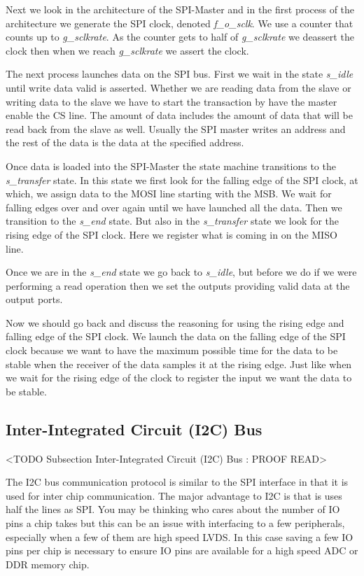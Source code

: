Next we look in the architecture of the \ac{SPI}-Master and in the first process of the architecture we generate the \ac{SPI} clock, denoted \emph{f\_o\_sclk}. We use a counter that counts up to \emph{g\_sclkrate}. As the counter gets to half of \emph{g\_sclkrate} we deassert the clock then when we reach \emph{g\_sclkrate} we assert the clock. 

The next process launches data on the \ac{SPI} bus. First we wait in the state \emph{s\_idle} until write data valid is asserted. Whether we are reading data from the slave or writing data to the slave we have to start the transaction by have the master enable the \ac{CS} line. The amount of data includes the amount of data that will be read back from the slave as well. Usually the \ac{SPI} master writes an address and the rest of the data is the data at the specified address.

Once data is loaded into the \ac{SPI}-Master the state machine transitions to the \emph{s\_transfer} state. In this state we first look for the falling edge of the \ac{SPI} clock, at which, we assign data to the \ac{MOSI} line starting with the \ac{MSB}. We wait for falling edges over and over again until we have launched all the data. Then we transition to the \emph{s\_end} state. But also in the \emph{s\_transfer} state we look for the rising edge of the \ac{SPI} clock. Here we register what is coming in on the \ac{MISO} line. 

Once we are in the \emph{s\_end} state we go back to \emph{s\_idle}, but before we do if we were performing a read operation then we set the outputs providing valid data at the output ports. 

Now we should go back and discuss the reasoning for using the rising edge and falling edge of the \ac{SPI} clock. We launch the data on the falling edge of the \ac{SPI} clock because we want to have the maximum possible time for the data to be stable when the receiver of the data samples it at the rising edge. Just like when we wait for the rising edge of the clock to register the input we want the data to be stable. 

\subsection{Inter-Integrated Circuit (I2C) Bus}
	<TODO Subsection Inter-Integrated Circuit (I2C) Bus : PROOF READ>

The \ac{I2C} bus communication protocol is similar to the \ac{SPI} interface in that it is used for inter chip communication. The major advantage to \ac{I2C} is that is uses half the lines as \ac{SPI}. You may be thinking who cares about the number of \ac{IO} pins a chip takes but this can be an issue with interfacing to a few peripherals, especially when a few of them are high speed \ac{LVDS}. In this case saving a few \ac{IO} pins per chip is necessary to ensure \ac{IO} pins are available for a high speed \ac{ADC} or \ac{DDR} memory chip. 	
	
